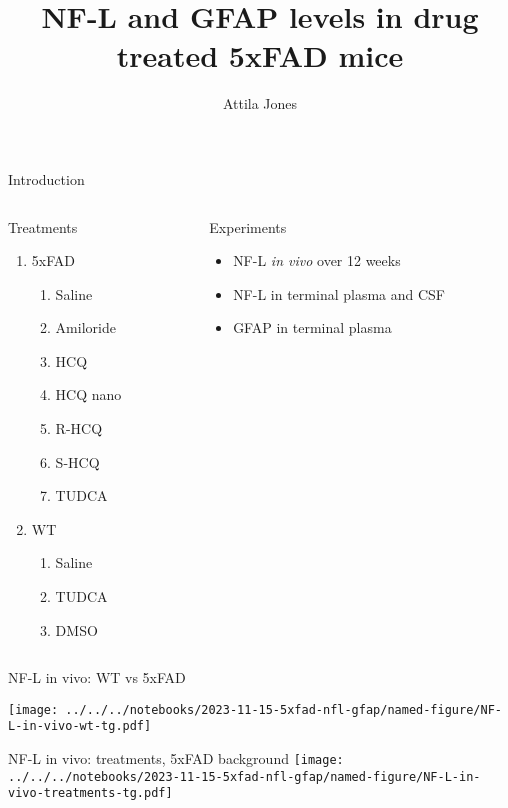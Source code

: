 \documentclass[aspectratio=169]{beamer}
\title{NF-L and GFAP levels in drug treated 5xFAD mice}
\subtitle{}
\author{Attila Jones}
\date{}
\begin{document}
\titlepage

\begin{frame}{Introduction}
\begin{columns}[t]
\begin{column}{0.5\textwidth}

Treatments

\begin{enumerate}
  \item 5xFAD
  \begin{enumerate}
    \item Saline
    \item Amiloride
    \item HCQ
    \item HCQ nano
    \item R-HCQ
    \item S-HCQ
    \item TUDCA
  \end{enumerate}
  \item WT
  \begin{enumerate}
    \item Saline
    \item TUDCA
    \item DMSO
  \end{enumerate}
\end{enumerate}
\end{column}

\begin{column}{0.5\textwidth}

Experiments

\begin{itemize}
  \item NF-L \emph{in vivo} over 12 weeks
  \item NF-L in terminal plasma and CSF
  \item GFAP in terminal plasma
\end{itemize}
\end{column}
\end{columns}
\end{frame}

\begin{frame}{NF-L in vivo: WT vs 5xFAD}
\begin{center}
\texttt{[image: ../../../notebooks/2023-11-15-5xfad-nfl-gfap/named-figure/NF-L-in-vivo-wt-tg.pdf]}
\end{center}
\end{frame}

\begin{frame}{NF-L in vivo: treatments, 5xFAD background}
\texttt{[image: ../../../notebooks/2023-11-15-5xfad-nfl-gfap/named-figure/NF-L-in-vivo-treatments-tg.pdf]}
\end{frame}
\end{document}
